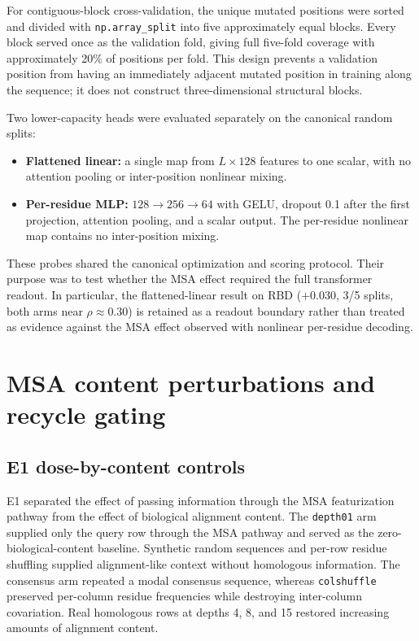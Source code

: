 \documentclass[10pt,a4paper]{article}
\begin{document}
For contiguous-block cross-validation, the unique mutated positions were sorted and divided with \texttt{np.array\_split} into five approximately equal blocks. Every block served once as the validation fold, giving full five-fold coverage with approximately 20\% of positions per fold. This design prevents a validation position from having an immediately adjacent mutated position in training along the sequence; it does not construct three-dimensional structural blocks.

Two lower-capacity heads were evaluated separately on the canonical random splits:

\begin{itemize}
    \item \textbf{Flattened linear:} a single map from $L\times128$ features to one scalar, with no attention pooling or inter-position nonlinear mixing.
    \item \textbf{Per-residue MLP:} $128\rightarrow256\rightarrow64$ with GELU, dropout 0.1 after the first projection, attention pooling, and a scalar output. The per-residue nonlinear map contains no inter-position mixing.
\end{itemize}

These probes shared the canonical optimization and scoring protocol. Their purpose was to test whether the MSA effect required the full transformer readout. In particular, the flattened-linear result on RBD ($+0.030$, 3/5 splits, both arms near $\rho\approx0.30$) is retained as a readout boundary rather than treated as evidence against the MSA effect observed with nonlinear per-residue decoding.

\section{MSA content perturbations and recycle gating}

\subsection{E1 dose-by-content controls}

E1 separated the effect of passing information through the MSA featurization pathway from the effect of biological alignment content. The \texttt{depth01} arm supplied only the query row through the MSA pathway and served as the zero-biological-content baseline. Synthetic random sequences and per-row residue shuffling supplied alignment-like context without homologous information. The consensus arm repeated a modal consensus sequence, whereas \texttt{colshuffle} preserved per-column residue frequencies while destroying inter-column covariation. Real homologous rows at depths 4, 8, and 15 restored increasing amounts of alignment content.
\end{document}
